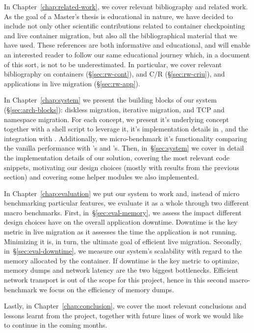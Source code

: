 In Chapter~\ref{chap:related-work}, we cover relevant bibliography and related work.
As the goal of a Master's thesis is educational in nature, we have decided to include not only other scientific contributions related to container checkpointing and live container migration, but also all the bibliographical material that we have used.
These references are both informative and educational, and will enable an interested reader to follow our same educational journey which, in a document of this sort, is not to be underestimated.
In particular, we cover relevant bibliography on containers (\S\ref{sec:rw-cont}), \criu and C/R (\S\ref{sec:rw-criu}), and applications in live migration (\S\ref{sec:rw-app}).

In Chapter~\ref{chap:system} we present the building blocks of our system (\S\ref{sec:arch-blocks}): diskless migration, iterative migration, and TCP and namespace migration.
For each concept, we present it's underlying concept together with a shell script to leverage it, it's implementation details in \criu, and the integration with \runc.
Additionally, we micro-benchmark it's functionality comparing the vanilla performance with \criu's and \runc's.
Then, in~\S\ref{sec:system} we cover in detail the implementation details of our solution, covering the most relevant code snippets, motivating our design choices (mostly with results from the previous section) and covering some helper modules we also implemented.

In Chapter~\ref{chap:evaluation} we put our system to work and, instead of micro benchmarking particular features, we evaluate it as a whole through two different macro benchmarks.
First, in~\S\ref{sec:eval-memory}, we assess the impact different design choices have on the overall application downtime.
Downtime is the key metric in live migration as it assesses the time the application is not running.
Minimizing it is, in turn, the ultimate goal of efficient live migration.
Secondly, in~\S\ref{sec:eval-downtime}, we measure our system's scalability with regard to the memory allocated by the container.
If downtime is the key metric to optimize, memory dumps and network latency are the two biggest bottlenecks.
Efficient network transport is out of the scope for this project, hence in this second macro-benchmark we focus on the efficiency of memory dumps.

Lastly, in Chapter~\ref{chap:conclusion}, we cover the most relevant conclusions and lessons learnt from the project, together with future lines of work we would like to continue in the coming months.
